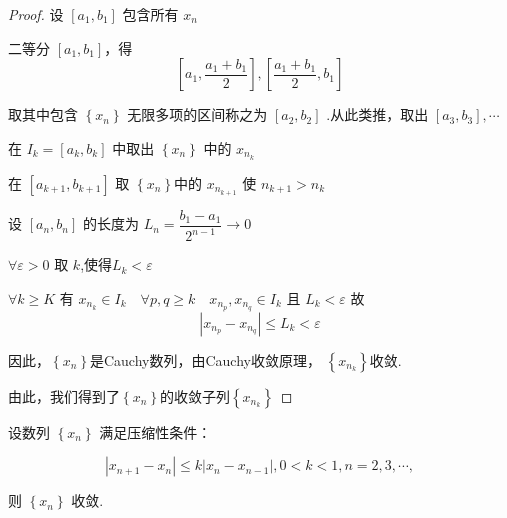 \begin{proof}
	设 $\left[a_1, b_1\right]$ 包含所有 $x_n$
	
	二等分 $\left[a_1, b_1\right]$，得
	$$\left[a_1, \dfrac{a_1+b_1}{2}\right],\left[\dfrac{a_1+b_1}{2}, b_1\right]$$ 
	
	取其中包含 $\left\{x_n\right\}$ 无限多项的区间称之为 $\left[a_2, b_2\right]$ .从此类推，取出 $\left[a_3, b_3\right],\cdots$
	
	在 $I_k=\left[a_k, b_k\right]$ 中取出 $\left\{x_n\right\}$ 中的 $x_{n_k}$
	
	在 $\left[a_{k+1}, b_{k+1}\right]$ 取 $\left\{x_n\right\}$中的 $x_{n_{k+1}}$ 使 $n_{k+1}>n_k$
	
	设 $\left[a_n, b_n\right]$ 的长度为 $L_n=\dfrac{b_1-a_1}{2^{n-1}} \rightarrow 0$
	
	$\forall \varepsilon>0$ 取 $k$,使得$L_ k<\varepsilon$ 
	
	$\forall k \geqslant K$ 有 $x_{n_k} \in I_k \quad \forall p, q \geqslant k \quad x_{n_p}, x_{n_q} \in I_k$ 且 $L_k<\varepsilon$ 故 
	$$\left|x_{n_p}-x_{n _q}\right| \leqslant L_k<\varepsilon$$
	
	因此，$\left\{x_n\right\}$是Cauchy数列，由Cauchy收敛原理，
	$\left\{x_{n_k}\right\}$收敛.
	
	由此，我们得到了$\left\{x_n\right\}$的收敛子列$\left\{x_{n_k}\right\}$
\end{proof}
\begin{proposition}
	设数列 $\left\{x_n\right\}$ 满足压缩性条件：
	
	$$
	\left|x_{n+1}-x_n\right| \leqslant k\left|x_n-x_{n-1}\right|, 0<k<1, n=2,3, \cdots,
	$$
	
	
	则 $\left\{x_n\right\}$ 收敛.
\end{proposition}


